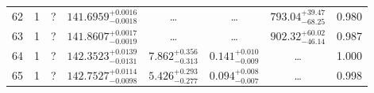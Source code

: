 \begin{table*}[!]
\begin{tabular}{llcrrlrc}
62 & 1 & ? & $    141.6959_{-      0.0018}^{+      0.0016}$ & \multicolumn{1}{c}{\dots} & \multicolumn{1}{c}{\dots} & $      793.04_{-       68.25}^{+       39.47}$ & 0.980 \\[1pt]
63 & 1 & ? & $    141.8607_{-      0.0019}^{+      0.0017}$ & \multicolumn{1}{c}{\dots} & \multicolumn{1}{c}{\dots} & $      902.32_{-       46.14}^{+       60.02}$ & 0.987 \\[1pt]
64 & 1 & ? & $    142.3523_{-      0.0131}^{+      0.0139}$ & $       7.862_{-       0.313}^{+       0.356}$ & $       0.141_{-       0.009}^{+       0.010}$ & \multicolumn{1}{c}{\dots} & 1.000\\[1pt]
65 & 1 & ? & $    142.7527_{-      0.0098}^{+      0.0114}$ & $       5.426_{-       0.277}^{+       0.293}$ & $       0.094_{-       0.007}^{+       0.008}$ & \multicolumn{1}{c}{\dots} & 0.998\\[1pt]
\hline
\end{tabular}
\end{table*}


